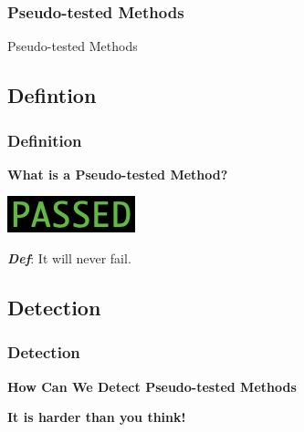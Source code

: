 \begin{frame}
	\frametitle{Pseudo-tested Methods}
	\begin{center}
    \huge{Pseudo-tested Methods}
  \end{center}
\end{frame}

\subsection{Defintion}
\begin{frame}
  \frametitle{Definition}
    \begin{center}
      \textbf{What is a Pseudo-tested Method?}

      \vspace{10mm}
      \includegraphics{images/passing}

      \vspace{10mm}
      \textbf{\textit{Def}}: It will never fail.
    \end{center}
\end{frame}

\subsection{Detection}
\begin{frame}
  \frametitle{Detection}
    \begin{center}
      \textbf{How Can We Detect Pseudo-tested Methods}

			\vspace{20mm}
			\textbf{It is harder than you think!}

    \end{center}
\end{frame}

%
%
